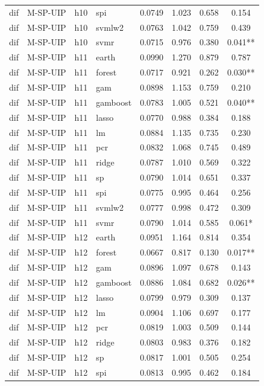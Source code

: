 \begin{ThreePartTable}
\begin{longtable}[t]{llclcccc}
dif & M-SP-UIP & h10 & spi & 0.0749 & 1.023 & 0.658 & 0.154\\
dif & M-SP-UIP & h10 & svmlw2 & 0.0763 & 1.042 & 0.759 & 0.439\\
dif & M-SP-UIP & h10 & svmr & 0.0715 & 0.976 & 0.380 & 0.041**\\
\addlinespace
dif & M-SP-UIP & h11 & earth & 0.0990 & 1.270 & 0.879 & 0.787\\
dif & M-SP-UIP & h11 & forest & 0.0717 & 0.921 & 0.262 & 0.030**\\
dif & M-SP-UIP & h11 & gam & 0.0898 & 1.153 & 0.759 & 0.210\\
dif & M-SP-UIP & h11 & gamboost & 0.0783 & 1.005 & 0.521 & 0.040**\\
dif & M-SP-UIP & h11 & lasso & 0.0770 & 0.988 & 0.384 & 0.188\\
dif & M-SP-UIP & h11 & lm & 0.0884 & 1.135 & 0.735 & 0.230\\
dif & M-SP-UIP & h11 & pcr & 0.0832 & 1.068 & 0.745 & 0.489\\
dif & M-SP-UIP & h11 & ridge & 0.0787 & 1.010 & 0.569 & 0.322\\
dif & M-SP-UIP & h11 & sp & 0.0790 & 1.014 & 0.651 & 0.337\\
dif & M-SP-UIP & h11 & spi & 0.0775 & 0.995 & 0.464 & 0.256\\
dif & M-SP-UIP & h11 & svmlw2 & 0.0777 & 0.998 & 0.472 & 0.309\\
dif & M-SP-UIP & h11 & svmr & 0.0790 & 1.014 & 0.585 & 0.061*\\
\addlinespace
dif & M-SP-UIP & h12 & earth & 0.0951 & 1.164 & 0.814 & 0.354\\
dif & M-SP-UIP & h12 & forest & 0.0667 & 0.817 & 0.130 & 0.017**\\
dif & M-SP-UIP & h12 & gam & 0.0896 & 1.097 & 0.678 & 0.143\\
dif & M-SP-UIP & h12 & gamboost & 0.0886 & 1.084 & 0.682 & 0.026**\\
dif & M-SP-UIP & h12 & lasso & 0.0799 & 0.979 & 0.309 & 0.137\\
dif & M-SP-UIP & h12 & lm & 0.0904 & 1.106 & 0.697 & 0.177\\
dif & M-SP-UIP & h12 & pcr & 0.0819 & 1.003 & 0.509 & 0.144\\
dif & M-SP-UIP & h12 & ridge & 0.0803 & 0.983 & 0.376 & 0.182\\
dif & M-SP-UIP & h12 & sp & 0.0817 & 1.001 & 0.505 & 0.254\\
dif & M-SP-UIP & h12 & spi & 0.0813 & 0.995 & 0.462 & 0.184\\

\end{longtable}
\end{ThreePartTable}
